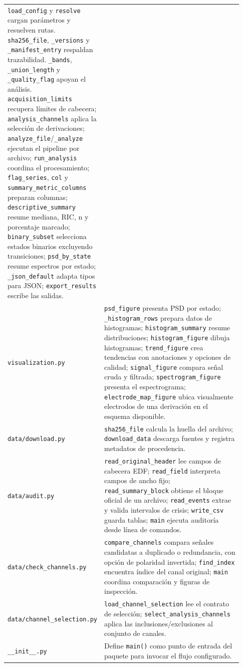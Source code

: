 \documentclass[11pt,a4paper]{article}
\begin{document}
\begin{longtable}{p{0.25\linewidth}p{0.68\linewidth}}
\texttt{load\_config} y \texttt{resolve} cargan parámetros y resuelven rutas. \texttt{sha256\_file}, \texttt{\_versions} y \texttt{\_manifest\_entry} respaldan trazabilidad. \texttt{\_bands}, \texttt{\_union\_length} y \texttt{\_quality\_flag} apoyan el análisis. \texttt{acquisition\_limits} recupera límites de cabecera; \texttt{analysis\_channels} aplica la selección de derivaciones; \texttt{analyze\_file}/\texttt{\_analyze} ejecutan el pipeline por archivo; \texttt{run\_analysis} coordina el procesamiento; \texttt{flag\_series}, \texttt{col} y \texttt{summary\_metric\_columns} preparan columnas; \texttt{descriptive\_summary} resume mediana, RIC, n y porcentaje marcado; \texttt{binary\_subset} selecciona estados binarios excluyendo transiciones; \texttt{psd\_by\_state} resume espectros por estado; \texttt{\_json\_default} adapta tipos para JSON; \texttt{export\_results} escribe las salidas.\\
\texttt{visualization.py} &
\texttt{psd\_figure} presenta PSD por estado; \texttt{\_histogram\_rows} prepara datos de histogramas; \texttt{histogram\_summary} resume distribuciones; \texttt{histogram\_figure} dibuja histogramas; \texttt{trend\_figure} crea tendencias con anotaciones y opciones de calidad; \texttt{signal\_figure} compara señal cruda y filtrada; \texttt{spectrogram\_figure} presenta el espectrograma; \texttt{electrode\_map\_figure} ubica visualmente electrodos de una derivación en el esquema disponible.\\
\texttt{data/download.py} &
\texttt{sha256\_file} calcula la huella del archivo; \texttt{download\_data} descarga fuentes y registra metadatos de procedencia.\\
\texttt{data/audit.py} &
\texttt{read\_original\_header} lee campos de cabecera EDF; \texttt{read\_field} interpreta campos de ancho fijo; \texttt{read\_summary\_block} obtiene el bloque oficial de un archivo; \texttt{read\_events} extrae y valida intervalos de crisis; \texttt{write\_csv} guarda tablas; \texttt{main} ejecuta auditoría desde línea de comandos.\\
\texttt{data/check\_channels.py} &
\texttt{compare\_channels} compara señales candidatas a duplicado o redundancia, con opción de polaridad invertida; \texttt{find\_index} encuentra índice del canal original; \texttt{main} coordina comparación y figuras de inspección.\\
\texttt{data/channel\_selection.py} &
\texttt{load\_channel\_selection} lee el contrato de selección; \texttt{select\_analysis\_channels} aplica las inclusiones/exclusiones al conjunto de canales.\\
\texttt{\_\_init\_\_.py} &
Define \texttt{main()} como punto de entrada del paquete para invocar el flujo configurado.\\
\bottomrule
\end{longtable}
\end{document}
